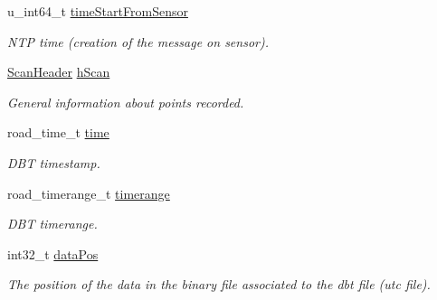 \begin{DoxyCompactItemize}
\item 
\hypertarget{structpacpus_1_1SickLDMRS__dbt_a3705d00b1ac65226c0db0acce5f5a2f0}{u\-\_\-int64\-\_\-t \hyperlink{structpacpus_1_1SickLDMRS__dbt_a3705d00b1ac65226c0db0acce5f5a2f0}{time\-Start\-From\-Sensor}}\label{structpacpus_1_1SickLDMRS__dbt_a3705d00b1ac65226c0db0acce5f5a2f0}

\begin{DoxyCompactList}\small\item\em N\-T\-P time (creation of the message on sensor). \end{DoxyCompactList}\item 
\hyperlink{structpacpus_1_1ScanHeader}{Scan\-Header} \hyperlink{structpacpus_1_1SickLDMRS__dbt_ae70266d0c8dc88727f72ff7b99cc34d5}{h\-Scan}
\begin{DoxyCompactList}\small\item\em General information about points recorded. \end{DoxyCompactList}\item 
\hypertarget{structpacpus_1_1SickLDMRS__dbt_ab801b239deb6f28fb66ee8a09de4e7d0}{road\-\_\-time\-\_\-t \hyperlink{structpacpus_1_1SickLDMRS__dbt_ab801b239deb6f28fb66ee8a09de4e7d0}{time}}\label{structpacpus_1_1SickLDMRS__dbt_ab801b239deb6f28fb66ee8a09de4e7d0}

\begin{DoxyCompactList}\small\item\em D\-B\-T timestamp. \end{DoxyCompactList}\item 
\hypertarget{structpacpus_1_1SickLDMRS__dbt_a6c5c05b3c33318053b18f04b060c73e4}{road\-\_\-timerange\-\_\-t \hyperlink{structpacpus_1_1SickLDMRS__dbt_a6c5c05b3c33318053b18f04b060c73e4}{timerange}}\label{structpacpus_1_1SickLDMRS__dbt_a6c5c05b3c33318053b18f04b060c73e4}

\begin{DoxyCompactList}\small\item\em D\-B\-T timerange. \end{DoxyCompactList}\item 
\hypertarget{structpacpus_1_1SickLDMRS__dbt_a60f3aad794ae72a451e7de1ee5e3c120}{int32\-\_\-t \hyperlink{structpacpus_1_1SickLDMRS__dbt_a60f3aad794ae72a451e7de1ee5e3c120}{data\-Pos}}\label{structpacpus_1_1SickLDMRS__dbt_a60f3aad794ae72a451e7de1ee5e3c120}

\begin{DoxyCompactList}\small\item\em The position of the data in the binary file associated to the dbt file (utc file). \end{DoxyCompactList}\end{DoxyCompactItemize}


